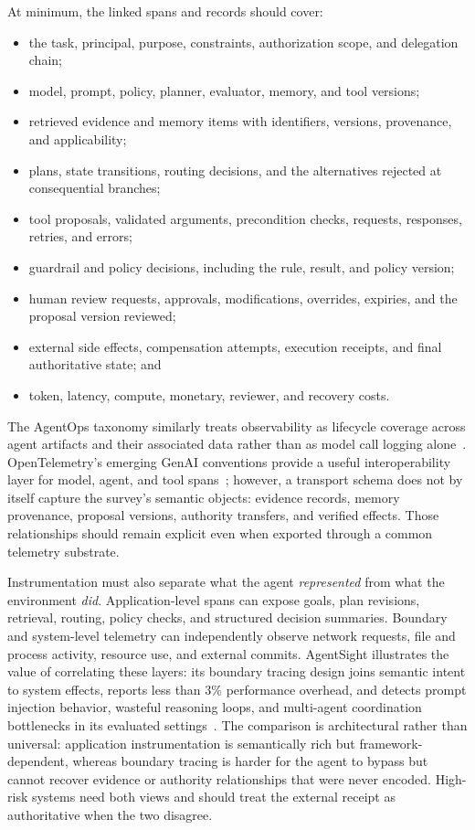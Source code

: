 At minimum, the linked spans and records should cover:
\begin{itemize}
    \item the task, principal, purpose, constraints, authorization scope, and delegation chain;
    \item model, prompt, policy, planner, evaluator, memory, and tool versions;
    \item retrieved evidence and memory items with identifiers, versions, provenance, and applicability;
    \item plans, state transitions, routing decisions, and the alternatives rejected at consequential branches;
    \item tool proposals, validated arguments, precondition checks, requests, responses, retries, and errors;
    \item guardrail and policy decisions, including the rule, result, and policy version;
    \item human review requests, approvals, modifications, overrides, expiries, and the proposal version reviewed;
    \item external side effects, compensation attempts, execution receipts, and final authoritative state; and
    \item token, latency, compute, monetary, reviewer, and recovery costs.
\end{itemize}
The AgentOps taxonomy similarly treats observability as lifecycle coverage across agent artifacts and their associated data rather than as model call logging alone~\cite{dong2024agentops}. OpenTelemetry's emerging GenAI conventions provide a useful interoperability layer for model, agent, and tool spans~\cite{opentelemetry2026genai}; however, a transport schema does not by itself capture the survey's semantic objects: evidence records, memory provenance, proposal versions, authority transfers, and verified effects. Those relationships should remain explicit even when exported through a common telemetry substrate.

Instrumentation must also separate what the agent \emph{represented} from what the environment \emph{did}. Application-level spans can expose goals, plan revisions, retrieval, routing, policy checks, and structured decision summaries. Boundary and system-level telemetry can independently observe network requests, file and process activity, resource use, and external commits. AgentSight illustrates the value of correlating these layers: its boundary tracing design joins semantic intent to system effects, reports less than 3\% performance overhead, and detects prompt injection behavior, wasteful reasoning loops, and multi-agent coordination bottlenecks in its evaluated settings~\cite{zheng2025agentsight}. The comparison is architectural rather than universal: application instrumentation is semantically rich but framework-dependent, whereas boundary tracing is harder for the agent to bypass but cannot recover evidence or authority relationships that were never encoded. High-risk systems need both views and should treat the external receipt as authoritative when the two disagree.

